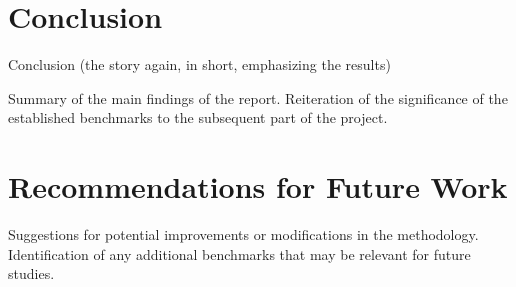 \section{Conclusion}
Conclusion (the story again, in short, emphasizing the results)

Summary of the main findings of the report.
Reiteration of the significance of the established benchmarks to the subsequent part of the project.

\section{Recommendations for Future Work}
Suggestions for potential improvements or modifications in the methodology.
Identification of any additional benchmarks that may be relevant for future studies.
